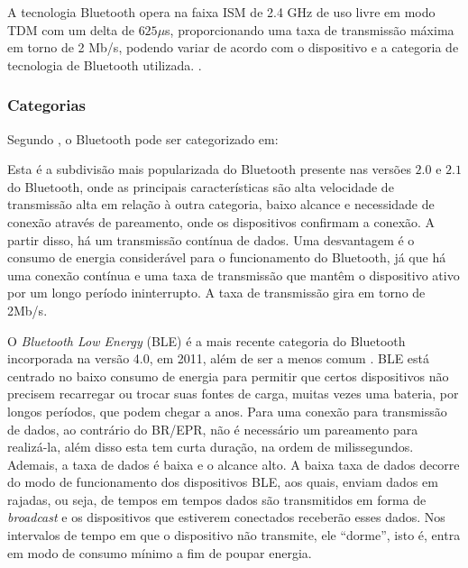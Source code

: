 \documentclass[
	article,			%
	11pt,				%
	oneside,			%
	a4paper,			%
	section=TITLE,		%
	subsection=TITLE,	%
	english,			%
	brazil,				%
	sumario=tradicional
	]{abntex2}
\begin{document}
A tecnologia Bluetooth opera na faixa ISM de 2.4 GHz de uso livre em modo TDM com 
um delta de $625\mu$s, proporcionando uma taxa de transmissão máxima em torno de 2 Mb/s, podendo 
variar de acordo com o dispositivo e a categoria de tecnologia de Bluetooth utilizada. 
\cite{bluetoothSIG2017}.


\subsubsection{Categorias}

Segundo \cite{sig2017}, o Bluetooth pode ser categorizado em:


Esta é a subdivisão mais popularizada do Bluetooth presente nas versões $2.0$ e $2.1$ do Bluetooth, 
onde as principais características são alta velocidade de transmissão alta em relação à outra 
categoria, baixo alcance e necessidade de conexão através de pareamento, onde os dispositivos 
confirmam a conexão. A partir disso, há um transmissão contínua de dados. 
Uma desvantagem é o consumo de energia considerável para o funcionamento do Bluetooth, já que há 
uma conexão contínua e uma taxa de transmissão que mantêm o dispositivo ativo por um longo 
período ininterrupto.
A taxa de transmissão gira em torno de 2Mb/s.
 

O \textit{Bluetooth Low Energy} (BLE) é a mais recente categoria do Bluetooth incorporada 
na versão 4.0, em 2011, além de ser a menos comum \cite{linklabs2015}.
BLE está centrado no baixo consumo de energia para permitir que certos 
dispositivos não precisem recarregar ou trocar suas fontes de carga, muitas vezes uma bateria, por 
longos períodos, que podem chegar a anos. 
Para uma conexão para transmissão de dados, ao contrário do BR/EPR, não é necessário um pareamento 
para realizá-la, além disso esta tem curta duração, na ordem de milissegundos.
Ademais, a taxa de dados é baixa e o alcance alto. A baixa taxa de dados decorre do modo de 
funcionamento dos dispositivos BLE, aos quais, enviam dados em rajadas, ou seja, de tempos em 
tempos dados são transmitidos em forma de \textit{broadcast} e os dispositivos que estiverem 
conectados receberão esses dados. Nos intervalos de tempo em que o dispositivo não transmite, ele 
``dorme'', isto é, entra em modo de consumo mínimo a fim de poupar energia.
\end{document}
